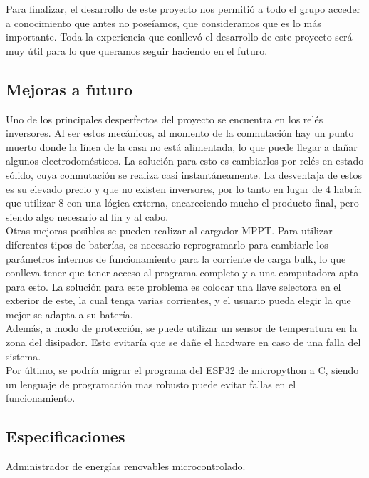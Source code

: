 Para finalizar, el desarrollo de este proyecto nos permitió a todo el grupo acceder a conocimiento que antes no poseíamos, que consideramos que es lo más importante. Toda la experiencia que conllevó el desarrollo de este proyecto será muy útil para lo que queramos seguir haciendo en el futuro.\\

\subsection{Mejoras a futuro}

Uno de los principales desperfectos del proyecto se encuentra en los relés inversores. Al ser estos mecánicos, al momento de la conmutación hay un punto muerto donde la línea de la casa no está alimentada, lo que puede llegar a dañar algunos electrodomésticos. La solución para esto es cambiarlos por relés en estado sólido, cuya conmutación se realiza casi instantáneamente. La desventaja de estos es su elevado precio y que no existen inversores, por lo tanto en lugar de 4 habría que utilizar 8 con una lógica externa, encareciendo mucho el producto final, pero siendo algo necesario al fin y al cabo.\\

Otras mejoras posibles se pueden realizar al cargador MPPT. Para utilizar diferentes tipos de baterías, es necesario reprogramarlo para cambiarle los parámetros internos de funcionamiento para la corriente de carga bulk, lo que conlleva tener que tener acceso al programa completo y a una computadora apta para esto. La solución para este problema es colocar una llave selectora en el exterior de este, la cual tenga varias corrientes, y el usuario pueda elegir la que mejor se adapta a su batería.\\

Además, a modo de protección, se puede utilizar un sensor de temperatura en la zona del disipador. Esto evitaría que se dañe el hardware en caso de una falla del sistema.\\

Por último, se podría migrar el programa del ESP32 de micropython a C, siendo un lenguaje de programación mas robusto puede evitar fallas en el funcionamiento.\\ 

\subsection{Especificaciones}
Administrador de energías renovables microcontrolado.


